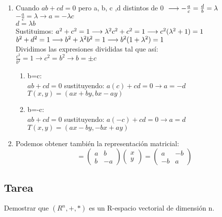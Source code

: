 \documentclass{book}
\begin{document}
\begin{enumerate}
\begin{enumerate}
    \end{enumerate}
    \item Cuando $ab+cd=0$ pero a, b, c ,d distintos de 0
    $\\ \longrightarrow-\frac{a}{c}=\frac{d}{b}=\lambda$
    \\$-\frac{a}{c}=\lambda\longrightarrow a=-\lambda c$
    \\$d=\lambda b$
    \\ Sustituimos:
    $\\a^2+c^2=1\longrightarrow \lambda^2c^2+c^2=1\longrightarrow c^2(\lambda^2+1)=1$
    $\\b^2+d^2=1\longrightarrow b^2+\lambda^2b^2=1\longrightarrow b^2(1+\lambda^2)=1$
    \\Dividimos las expresiones divididas tal que así:
    \\$\frac{c^2}{b^2}=1\longrightarrow c^2=b^2\longrightarrow b=\pm c$
    \begin{enumerate}
        \item b=c:
        \\$ab+cd=0$ sustituyendo: $a(c)+cd=0 \longrightarrow a=-d $
        \\$T(x,y)=(ax+by,bx-ay)$
        \item b=-c:
        \\$ab+cd=0$ sustituyendo: $a(-c)+cd=0 \longrightarrow a=d $
        \\$T(x,y)=(ax-by,-bx+ay)$
    \end{enumerate}
    \item Podemos obtener también la representación matricial:
    \\
    \begin{equation}
      [T]=
        \begin{pmatrix}
            a & b\\
            b & -a
        \end{pmatrix}
        \begin{pmatrix}
            x\\
            y
        \end{pmatrix}
        =
        \begin{pmatrix}
            a & -b\\
            -b & a
        \end{pmatrix}
    \end{equation}
\end{enumerate}

\subsection{Tarea}
Demostrar que $(R^n,+,*)$ es un R-espacio vectorial de dimensión n.
\end{document}
